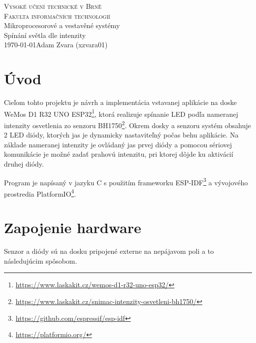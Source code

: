 \documentclass[a4paper]{article}
\begin{document}
\begin{titlepage}
\begin{center}
    \Huge
    \textsc{Vysoké učení technické v Brně\\[-0.2em]
    \huge
    Fakulta informačních technologií}\\
    \large
    Mikroprocesorové a vestavěné systémy\\
    \LARGE
    Spínání světla dle intenzity\\
    \Large
    \today \hfill Adam Zvara (xzvara01)
\end{center}
\end{titlepage}

\section{Úvod}

Cieľom tohto projektu je návrh a implementácia vstavanej aplikácie na doske WeMos D1 R32 UNO ESP32\footnote{\href{https://www.laskakit.cz/wemos-d1-r32-uno-esp32/}{https://www.laskakit.cz/wemos-d1-r32-uno-esp32/}}, ktorá realizuje spínanie LED podľa nameranej intenzity osvetlenia zo senzoru BH1750\footnote{\href{https://www.laskakit.cz/snimac-intenzity-osvetleni-bh1750/}{https://www.laskakit.cz/snimac-intenzity-osvetleni-bh1750/}}.
Okrem dosky a senzoru systém obsahuje 2 LED diódy, ktorých jas je dynamicky nastaviteľný počas behu aplikácie. Na základe nameranej intenzity je ovládaný jas prvej diódy a pomocou sériovej komunikácie je možné zadať prahovú intenzitu, pri ktorej dôjde ku aktivácií druhej diódy.

Program je napísaný v jazyku C s použitím frameworku ESP-IDF\footnote{\href{https://github.com/espressif/esp-idf}{https://github.com/espressif/esp-idf}} a vývojového prostredia PlatformIO\footnote{\href{https://platformio.org/}{https://platformio.org/}}.

\section{Zapojenie hardware}
Senzor a diódy sú na dosku pripojené externe na nepájavom poli a to následujúcim spôsobom.
\end{document}
